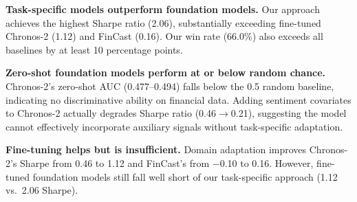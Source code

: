 \documentclass[a4paper,10pt,conference]{IEEEtran}
\begin{document}
\begin{table}[htbp]
\caption{Comparison with Foundation Models (Sharpe-Optimized)}
\label{tab:sota}
\centering
{}
\end{table}

\textbf{Task-specific models outperform foundation models.} Our approach achieves the highest Sharpe ratio (2.06), substantially exceeding fine-tuned Chronos-2 (1.12) and FinCast (0.16). Our win rate (66.0\%) also exceeds all baselines by at least 10 percentage points.

\textbf{Zero-shot foundation models perform at or below random chance.} Chronos-2's zero-shot AUC (0.477--0.494) falls below the 0.5 random baseline, indicating no discriminative ability on financial data. Adding sentiment covariates to Chronos-2 actually degrades Sharpe ratio (0.46$\rightarrow$0.21), suggesting the model cannot effectively incorporate auxiliary signals without task-specific adaptation.

\textbf{Fine-tuning helps but is insufficient.} Domain adaptation improves Chronos-2's Sharpe from 0.46 to 1.12 and FinCast's from $-$0.10 to 0.16. However, fine-tuned foundation models still fall well short of our task-specific approach (1.12 vs.\ 2.06 Sharpe).
\end{document}
